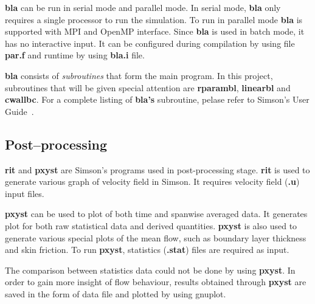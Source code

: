  {\bf bla} can be run in serial mode and parallel mode. In serial mode, {\bf bla} only requires a single processor to run the simulation. To run in parallel mode {\bf bla} is supported with MPI and OpenMP interface. Since {\bf bla} is used in batch mode, it has no interactive input. It can be configured during compilation by using file {\bf par.f} and runtime by using {\bf bla.i} file.

{\bf bla} consists of \emph{subroutines} that form the main program. In this project, subroutines that will be given special attention are {\bf rparambl}, {\bf linearbl} and {\bf cwallbc}. For a complete listing of {\bf bla's} subroutine, pelase refer to Simson's User Guide~\cite{Simson}.

\subsection{Post--processing}
{\bf rit} and {\bf pxyst} are Simson's programs used in post-processing stage. {\bf rit} is used to generate various graph of velocity field in Simson. It requires velocity field  ({\bf .u}) input files.

{\bf pxyst} can be used to plot of both time and spanwise averaged data. It generates plot for both raw statistical data and derived quantities. {\bf pxyst} is also used to generate various special plots of the mean flow, such as boundary layer thickness and skin friction. To run {\bf pxyst},  statistics ({\bf .stat}) files are required  as input.

The comparison between statistics data could not be done by using {\bf pxyst}. In order to gain more insight of flow behaviour, results obtained through {\bf pxyst} are saved in the form of data file and plotted by using gnuplot.
